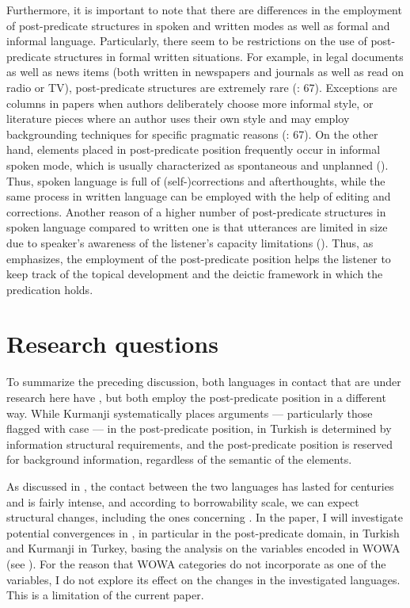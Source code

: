 \documentclass[output=paper,colorlinks,citecolor=brown]{langscibook}
\begin{document}
Furthermore, it is important to note that there are differences in the employment of post-predicate structures in spoken and written modes as well as formal and informal language. Particularly, there seem to be restrictions on the use of post-predicate structures in formal written situations. For example, in legal documents as well as news items (both written in newspapers and journals as well as read on radio or TV), post-predicate structures are extremely rare (\citealt{erguvanli1984function}: 67). Exceptions are columns in papers when authors deliberately choose more informal style, or literature pieces where an author uses their own style and may employ backgrounding techniques for specific pragmatic reasons (\citealt{erguvanli1984function}: 67). On the other hand, elements placed in post-predicate position frequently occur in informal spoken mode, which is usually characterized as spontaneous and unplanned (\citealt{schroeder1995postpredicate}). Thus, spoken language is full of (self-)corrections and afterthoughts, while the same process in written language can be employed with the help of editing and corrections. Another reason of a higher number of post-predicate structures in spoken language compared to written one is that utterances are limited in size due to speaker's awareness of the listener's capacity limitations (\citealt{chafe1985linguistic}). Thus, as \citet[206]{schroeder1995postpredicate} emphasizes, the employment of the post-predicate position helps the listener to keep track of the topical development and the deictic framework in which the predication holds. 

\section{Research questions}\label{bilingual:ss:4}
\largerpage
To summarize the preceding discussion, both languages in contact that are under research here have  , but both employ the post-predicate position in a different way. While Kurmanji systematically places  arguments --- particularly those flagged with case --- in the post-predicate position,  in Turkish is determined by information structural requirements, and the post-predicate position is reserved for background information, regardless of the semantic  of the elements. 

As discussed in , the contact between the two languages has lasted for centuries and is fairly intense, and according to  borrowability scale, we can expect structural changes, including the ones concerning . In the paper, I will investigate potential convergences in , in particular in the post-predicate domain, in Turkish and Kurmanji in Turkey, basing the analysis on the variables encoded in WOWA (see ). For the reason that WOWA categories do not incorporate  as one of the variables, I do not explore its effect on the  changes in the investigated languages. This is a limitation of the current paper.
\end{document}
